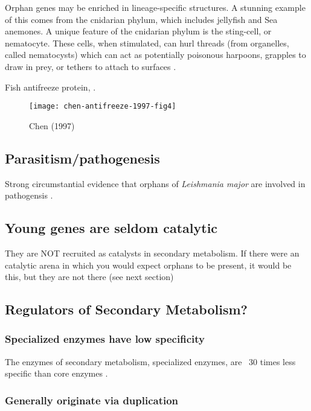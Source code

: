     Orphan genes may be enriched in lineage-specific structures. A stunning
    example of this comes from the cnidarian phylum, which includes jellyfish
    and Sea anemones. A unique feature of the cnidarian phylum is the
    sting-cell, or nematocyte. These cells, when stimulated, can hurl threads
    (from organelles, called nematocysts) which can act as potentially
    poisonous harpoons, grapples to draw in prey, or tethers to attach to
    surfaces \cite{kass-simon_behavioral_2002}.

    Fish antifreeze protein, \cite{chen_evolution_1997}.

    \begin{figure}[h!]
        \centering
        \texttt{[image: chen-antifreeze-1997-fig4]}
        \caption{Chen (1997) \cite{chen_evolution_1997}}
    \end{figure}
    \FloatBarrier

\subsection{Parasitism/pathogenesis}

  Strong circumstantial evidence that orphans of \textit{Leishmania major} are
  involved in pathogensis \cite{mukherjee_elucidating_2015}.

\subsection{Young genes are seldom catalytic}

    They are NOT recruited as catalysts in secondary metabolism. If there were
    an catalytic arena in which you would expect orphans to be present, it
    would be this, but they are not there (see next section)

\subsection{Regulators of Secondary Metabolism?}

\subsubsection{Specialized enzymes have low specificity}

    The enzymes of secondary metabolism, specialized enzymes, are ~30 times
    less specific than core enzymes \cite{bar-even_moderately_2011}.

\subsubsection{Generally originate via duplication}

